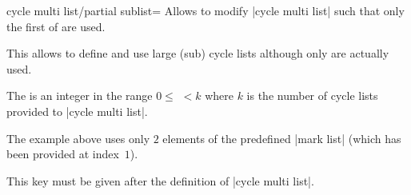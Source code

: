 \begin{pgfplotskey}{cycle multi list/partial sublist=}
	Allows to modify |cycle multi list| such that only the first  of  are used.

	This allows to define and use large (sub) cycle lists although only  are actually used.

	The  is an integer in the range $0 \le $ $ < k$ where $k$ is the number of cycle lists provided to |cycle multi list|.

\begin{codeexample}[]
\end{codeexample}
	
	The example above uses only $2$ elements of the predefined |mark list| (which has been provided at index~$1$).

	This key must be given after the definition of |cycle multi list|.
\end{pgfplotskey}

